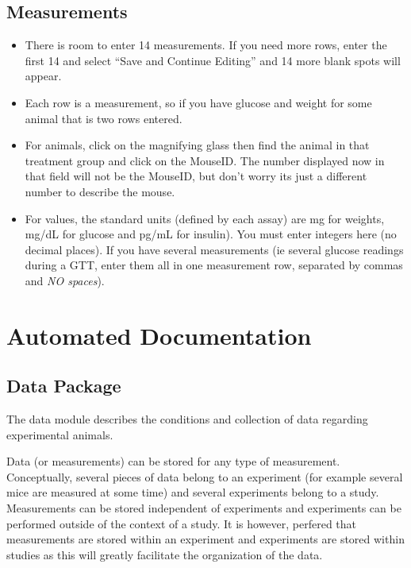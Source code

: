 \documentclass[letterpaper,10pt,english]{sphinxmanual}
\begin{document}
\section{Measurements}
\begin{itemize}
\item {} 
There is room to enter 14 measurements.  If you need more rows, enter the first 14 and select ``Save and Continue Editing'' and 14 more blank spots will appear.

\item {} 
Each row is a measurement, so if you have glucose and weight for some animal that is two rows entered.

\item {} 
For animals, click on the magnifying glass then find the animal in that treatment group and click on the MouseID. The number displayed now in that field will not be the MouseID, but don't worry its just a different number to describe the mouse.

\item {} 
For values, the standard units (defined by each assay) are mg for weights, mg/dL for glucose and pg/mL for insulin).  You must enter integers here (no decimal places).  If you have several measurements (ie several glucose readings during a GTT, enter them all in one measurement row, separated by commas and \emph{NO spaces}).

\end{itemize}

\resetcurrentobjects
\hypertarget{--doc-api}{}

\chapter{Automated Documentation}


\section{Data Package}
\hypertarget{module-data}{}
\modulesynopsis{}
The data module describes the conditions and collection of data regarding experimental animals.

Data (or measurements) can be stored for any type of measurement.  Conceptually, several pieces of data belong to an experiment (for example several mice are measured at some time) and several experiments belong to a study.  Measurements can be stored independent of experiments and experiments can be performed outside of the context of a study.  It is however, perfered that measurements are stored within an experiment and experiments are stored within studies as this will greatly facilitate the organization of the data.
\end{document}
